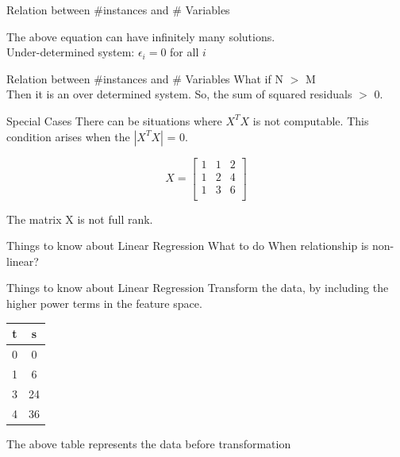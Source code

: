 \documentclass{beamer}
\begin{document}
\begin{frame}{Relation between \#instances and \# Variables}
            
    
    
    
    The above equation can have infinitely many solutions. \\
    Under-determined system: $\epsilon_{i} = 0$ for all $i$

\end{frame}

\begin{frame}{Relation between \#instances and \# Variables}
    What if N $>$ M\\
    Then it is an over determined system. So, the sum of squared residuals $>$ 0.
\end{frame}
\begin{frame}{Special Cases}
There can be situations where $X^{T}X$ is not computable. This condition arises when the $|X^{T}X|$ = 0.

\begin{equation}
    X = \begin{bmatrix}
        1 & 1& 2\\
        1 & 2& 4\\
        1 & 3& 6\\
    \end{bmatrix}
\end{equation}

The matrix X is not full rank. 
\end{frame}


\begin{frame}{Things to know about Linear Regression}
    What to do When relationship is non-linear?
\end{frame}


\begin{frame}{Things to know about Linear Regression}
    Transform the data, by including the higher power terms in the feature space. 
    
       
    \begin{center}
 \begin{tabular}{||c c||} 
 \hline
 t  & s \\ [0.5ex] 
 \hline\hline
 0 & 0 \\
 1 & 6 \\
 3 & 24 \\
 4 & 36 \\
 \hline
\end{tabular}
\end{center}

The above table represents the data before transformation
\end{frame}
\end{document}
